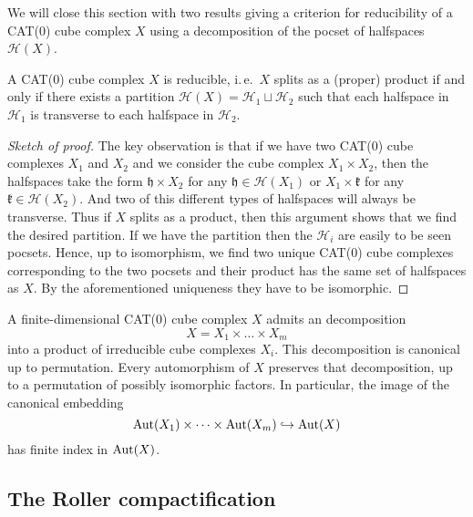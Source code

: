 We will close this section with two results giving a criterion for reducibility of a CAT(0) cube complex \(X\) using a decomposition of the pocset of halfspaces \(\mathcal{H}(X)\).

\begin{prop}
  A CAT(0) cube complex \(X\) is reducible, i.\,e.\ \(X\) splits as a (proper) product if and only if  there  exists a partition \(\mathcal{H}(X) = \mathcal{H}_1 \sqcup \mathcal{H}_2\) such that each halfspace in \(\mathcal{H}_1\) is transverse to each halfspace in \(\mathcal{H}_2\).
\end{prop}

\begin{proof}[Sketch of proof]
  The key observation is that if we have two CAT(0) cube complexes \(X_1\) and \(X_2\) and we consider the cube complex \(X_1 \times X_2\), then the halfspaces take the form \(\mathfrak{h} \times X_2\) for any \(\mathfrak{h} \in \mathcal{H}(X_1)\) or \(X_1 \times \mathfrak{k}\) for any \(\mathfrak{k} \in \mathcal{H}(X_2)\). And two of this different types of halfspaces will always be transverse. Thus if \(X\) splits as a product, then this argument shows that we find the desired partition. If we have the partition then the \(\mathcal{H}_i\) are easily to be seen pocsets. Hence, up to isomorphism, we find two unique CAT(0) cube complexes corresponding to the two pocsets and their product has the same set of halfspaces as \(X\). By the aforementioned uniqueness they have to be isomorphic.
\end{proof}

\begin{prop}
  \label{prop:cs-2.6}
  A finite-dimensional CAT(0) cube complex \(X\) admits an decomposition
  \[
    X = X_1 \times \dots \times X_m
  \]
  into a product of irreducible cube complexes \(X_i\). This decomposition is canonical up to permutation. Every automorphism of \(X\) preserves that decomposition, up to a permutation of possibly isomorphic factors. In particular, the image of the canonical embedding
  \[
    \operatorname{Aut}(X_1) \times \dots \times \operatorname{Aut}(X_m) \hookrightarrow \operatorname{Aut}(X)
  \]
  has finite index in \(\operatorname{Aut}(X)\).
\end{prop}

\subsection{The Roller compactification}
\label{sec:rb}

